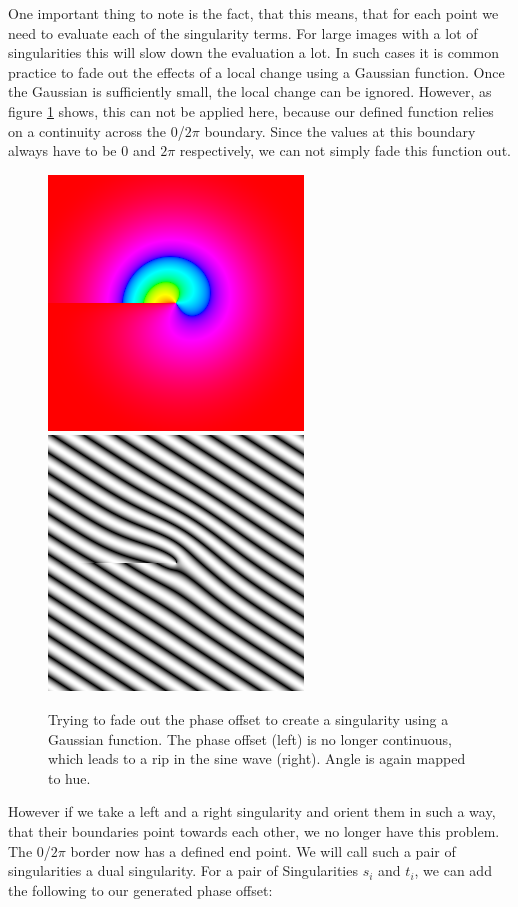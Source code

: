\documentclass{utue} %
\begin{document}
One important thing to note is the fact, that this means, that for each point we need to evaluate each of the singularity terms. For large images with a lot of singularities this will slow down the evaluation a lot. In such cases it is common practice to fade out the effects of a local change using a Gaussian function. Once the Gaussian is sufficiently small, the local change can be ignored. However, as figure \ref{fig:fadedSingularity} shows, this can not be applied here, because our defined function relies on a continuity across the $0$/$2\pi$ boundary. Since the values at this boundary always have to be $0$ and $2\pi$ respectively, we can not simply fade this function out.
\begin{figure}[h]
  \centering
  \includegraphics[width=0.45\linewidth]{images/fadedPhase}
  \includegraphics[width=0.45\linewidth]{images/fadedPhaseSineWave}
  \caption{Trying to fade out the phase offset to create a singularity using a Gaussian function. The phase offset (left) is no longer continuous, which leads to a rip in the sine wave (right). Angle is again mapped to hue.}\label{fig:fadedSingularity}
\end{figure}
However if we take a left and a right singularity and orient them in such a way, that their boundaries point towards each other, we no longer have this problem. The $0$/$2\pi$ border now has a defined end point. We will call such a pair of singularities a dual singularity. For a pair of Singularities $s_i$ and $t_i$, we can add the following to our generated phase offset:
\end{document}
